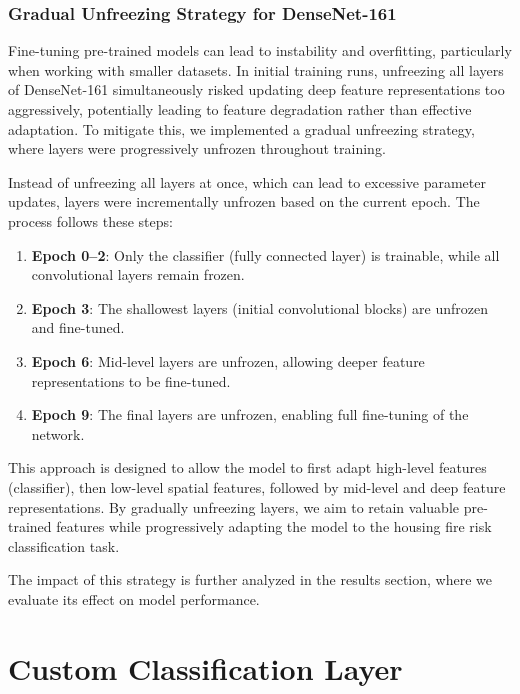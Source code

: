 \subsubsection*{Gradual Unfreezing Strategy for DenseNet-161}

Fine-tuning pre-trained models can lead to instability and overfitting, particularly when working 
with smaller datasets. In initial training runs, unfreezing all layers of DenseNet-161 simultaneously 
risked updating deep feature representations too aggressively, potentially leading to feature 
degradation rather than effective adaptation. To mitigate this, we implemented a gradual unfreezing 
strategy, where layers were progressively unfrozen throughout training.

Instead of unfreezing all layers at once, which can lead to excessive parameter updates, layers were 
incrementally unfrozen based on the current epoch. The process follows these steps:

\begin{enumerate}
    \item \textbf{Epoch 0--2}: Only the classifier (fully connected layer) is trainable, while all convolutional layers remain frozen.
    \item \textbf{Epoch 3}: The shallowest layers (initial convolutional blocks) are unfrozen and fine-tuned.
    \item \textbf{Epoch 6}: Mid-level layers are unfrozen, allowing deeper feature representations to be fine-tuned.
    \item \textbf{Epoch 9}: The final layers are unfrozen, enabling full fine-tuning of the network.
\end{enumerate}

This approach is designed to allow the model to first adapt high-level features (classifier), then 
low-level spatial features, followed by mid-level and deep feature representations. By gradually 
unfreezing layers, we aim to retain valuable pre-trained features while progressively adapting the 
model to the housing fire risk classification task.

The impact of this strategy is further analyzed in the results section, where we evaluate its effect 
on model performance.



\section{Custom Classification Layer}

